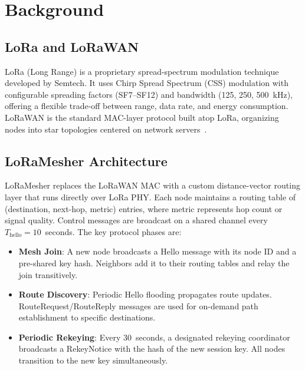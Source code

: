 \documentclass[journal]{IEEEtran}
\begin{document}
\section{Background}
\label{sec:background}

\subsection{LoRa and LoRaWAN}

LoRa (Long Range) is a proprietary spread-spectrum modulation technique
developed by Semtech. It uses Chirp Spread Spectrum (CSS) modulation
with configurable spreading factors (SF7–SF12) and bandwidth (125, 250,
500~kHz), offering a flexible trade-off between range, data rate, and
energy consumption. LoRaWAN is the standard MAC-layer protocol built
atop LoRa, organizing nodes into star topologies centered on network
servers~\cite{ieee2025-lorawan-aes-crypto}.

\subsection{LoRaMesher Architecture}

LoRaMesher replaces the LoRaWAN MAC with a custom distance-vector routing
layer that runs directly over LoRa PHY. Each node maintains a routing
table of (destination, next-hop, metric) entries, where metric represents
hop count or signal quality. Control messages are broadcast on a shared
channel every $T_{\text{hello}} = 10$~seconds. The key protocol phases are:

\begin{itemize}
  \item \textbf{Mesh Join}: A new node broadcasts a Hello message with
    its node ID and a pre-shared key hash. Neighbors add it to their
    routing tables and relay the join transitively.

  \item \textbf{Route Discovery}: Periodic Hello flooding propagates
    route updates. RouteRequest/RouteReply messages are used for
    on-demand path establishment to specific destinations.

  \item \textbf{Periodic Rekeying}: Every 30~seconds, a designated
    rekeying coordinator broadcasts a RekeyNotice with the hash of
    the new session key. All nodes transition to the new key
    simultaneously.
\end{itemize}
\end{document}
